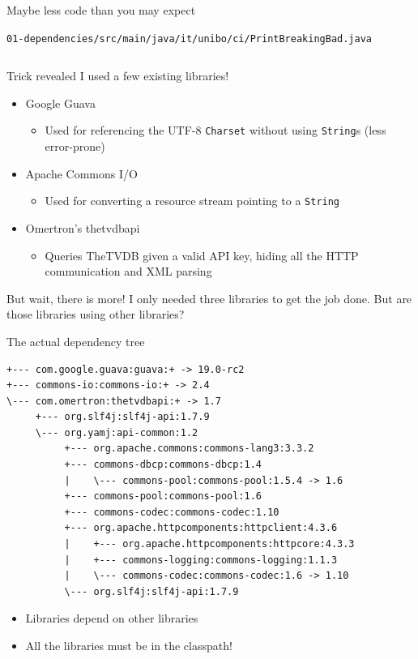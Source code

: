 \documentclass[presentation]{beamer}
\newcommand{\codefile}[3]{
	\begin{block}{\texttt{#1}}
		\inputminted[fontsize=#2,linenos=true,breaklines=true]{#3}{workspace/#1}
	\end{block}
}
\newcommand{\java}[2]{\codefile{#1}{#2}{java}}
\begin{document}
\begin{frame}[fragile]{Maybe less code than you may expect}
	\java{01-dependencies/src/main/java/it/unibo/ci/PrintBreakingBad.java}{\tiny}
\end{frame}

\begin{frame}[fragile]{Trick revealed}
  I used a few existing libraries!
  \begin{itemize}
    \item Google Guava
    \begin{itemize}
      \item Used for referencing the UTF-8 \texttt{Charset} without using \texttt{String}s (less error-prone)
    \end{itemize}
    \item Apache Commons I/O
    \begin{itemize}
      \item Used for converting a resource stream pointing to a \texttt{String} 
    \end{itemize}
    \item Omertron's thetvdbapi
    \begin{itemize}
      \item Queries TheTVDB given a valid API key, hiding all the HTTP communication and XML parsing
    \end{itemize}
  \end{itemize}
  \begin{block}{But wait, there is more!}
    I only needed three libraries to get the job done. But are those libraries using other libraries?
  \end{block}
\end{frame}

\begin{frame}[fragile]{The actual dependency tree}
  \begin{block}{}
    \begin{verbatim}
+--- com.google.guava:guava:+ -> 19.0-rc2
+--- commons-io:commons-io:+ -> 2.4
\--- com.omertron:thetvdbapi:+ -> 1.7
     +--- org.slf4j:slf4j-api:1.7.9
     \--- org.yamj:api-common:1.2
          +--- org.apache.commons:commons-lang3:3.3.2
          +--- commons-dbcp:commons-dbcp:1.4
          |    \--- commons-pool:commons-pool:1.5.4 -> 1.6
          +--- commons-pool:commons-pool:1.6
          +--- commons-codec:commons-codec:1.10
          +--- org.apache.httpcomponents:httpclient:4.3.6
          |    +--- org.apache.httpcomponents:httpcore:4.3.3
          |    +--- commons-logging:commons-logging:1.1.3
          |    \--- commons-codec:commons-codec:1.6 -> 1.10
          \--- org.slf4j:slf4j-api:1.7.9
    \end{verbatim}
  \end{block}
  \begin{itemize}
   \item Libraries depend on other libraries
   \item All the libraries must be in the classpath!
  \end{itemize}
\end{frame}
\end{document}
